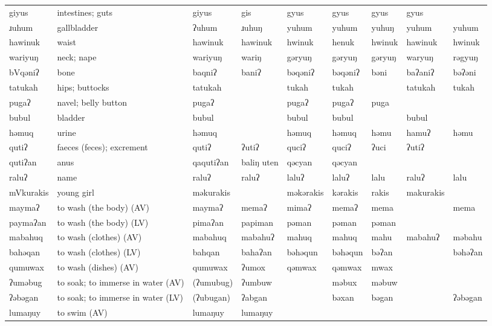 \begin{landscape}
\begin{longtable}{*{9}{>{\raggedright\arraybackslash}p{}}}
\text{*}giyus & intestines; guts & giyus & gis & gyus & gyus & gyus & gyus & \\
\text{*}ɹuhum & gallbladder & ʔuhum & ɹuhuŋ & yuhum & yuhum & yuhuŋ & yuhum & yuhum\\
\text{*}hawinuk & waist & hawinuk & hawinuk & hwinuk & henuk & hwinuk & hawinuk & hwinuk\\
\text{*}wariyuŋ & neck; nape & wariyuŋ & wariŋ & gəryuŋ & gəryuŋ & gəryuŋ & waryuŋ & rəgyuŋ\\
\text{*}bVqəniʔ & bone & baqniʔ & baniʔ & bəqəniʔ & bəqəniʔ & bəni & baʔaniʔ & bəʔəni\\
\text{*}tatukah & hips; buttocks & tatukah &  & tukah & tukah &  & tatukah & tukah\\
\text{*}pugaʔ & navel; belly button & pugaʔ &  & pugaʔ & pugaʔ & puga &  & \\
\text{*}bubul & bladder & bubul &  & bubul & bubul &  & bubul & \\
\text{*}həmuq & urine & həmuq &  & həmuq & həmuq & həmu & hamuʔ & həmu\\
\text{*}qutiʔ & faeces (feces); excrement & qutiʔ & ʔutiʔ & quciʔ & quciʔ & ʔuci & ʔutiʔ & \\
\text{*}qutiʔan & anus & qaqutiʔan & baliŋ uten & qəcyan & qəcyan &  &  & \\
\text{*}raluʔ & name & raluʔ & raluʔ & laluʔ & laluʔ & lalu & raluʔ & lalu\\
\text{*}mVkurakis & young girl & məkurakis &  & məkərakis & kərakis & rakis & makurakis & \\
\text{*}maymaʔ & to wash (the body) (AV) & maymaʔ & memaʔ & mimaʔ & memaʔ & mema &  & mema\\
\text{*}paymaʔan & to wash (the body) (LV) & pimaʔan & papiman & pəman & pəman & pəman &  & \\
\text{*}mabahuq & to wash (clothes) (AV) & mabahuq & mabahuʔ & mahuq & mahuq & mahu & mabahuʔ & məbahu\\
\text{*}bahəqan & to wash (clothes) (LV) & bahqan & bahaʔan & bəhəqun & bəhəqun & bəʔan &  & bəhəʔan\\
\text{*}qumuwax & to wash (dishes) (AV) & qumuwax & ʔumox & qəmwax & qəmwax & mwax &  & \\
\text{*}ʔuməbug & to soak; to immerse in water (AV) & (ʔumubug) & ʔumbuw &  & məbux & məbuw &  & \\
\text{*}ʔəbəgan & to soak; to immerse in water (LV) & (ʔubugan) & ʔabgan &  & bəxan & bəgan &  & ʔəbəgan\\
\text{*}lumaŋuy & to swim (AV) & lumaŋuy & lumaŋuy &  &  &  &  & \\

\end{longtable}
\end{landscape}
